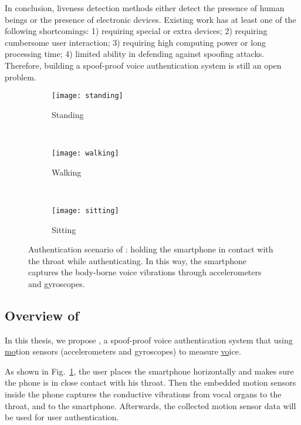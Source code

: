 In conclusion, liveness detection methods either detect the presence of human beings or the presence of electronic devices. Existing work has at least one of the following shortcomings: 1) requiring special or extra devices; 2) requiring cumbersome user interaction; 3) requiring high computing power or long processing time; 4) limited ability in defending against spoofing attacks. Therefore, building a spoof-proof voice authentication system is still an open problem.






\begin{figure}[!h]
	\centering
	\begin{subfigure}[t]{0.15\textwidth}
		\centering
		\texttt{[image: standing]}
		\caption{Standing}
	\end{subfigure}%
	~ 
	\begin{subfigure}[t]{0.15\textwidth}
		\centering
		\texttt{[image: walking]}
		\caption{Walking}
	\end{subfigure}
	~ 
	\begin{subfigure}[t]{0.15\textwidth}
		\centering
		\texttt{[image: sitting]}
		\caption{Sitting}
	\end{subfigure}
	\caption{Authentication scenario of {\shortname}: holding the smartphone in contact with the throat while authenticating. In this way, the smartphone captures the body-borne voice vibrations through accelerometers and gyroscopes.}
	\label{fig:use}
\end{figure}


\subsection{Overview of {\shortname}}

In this thesis, we propose {\shortname}, a spoof-proof voice authentication system that using \underline{mo}tion sensors (accelerometers and gyroscopes) to measure \underline{vo}ice.


As shown in Fig.~\ref{fig:use}, the user places the smartphone horizontally and makes sure the phone is in close contact with his throat. Then the embedded motion sensors inside the phone captures the conductive vibrations from vocal organs to the throat, and to the smartphone. Afterwards, the collected motion sensor data will be used for user authentication.


